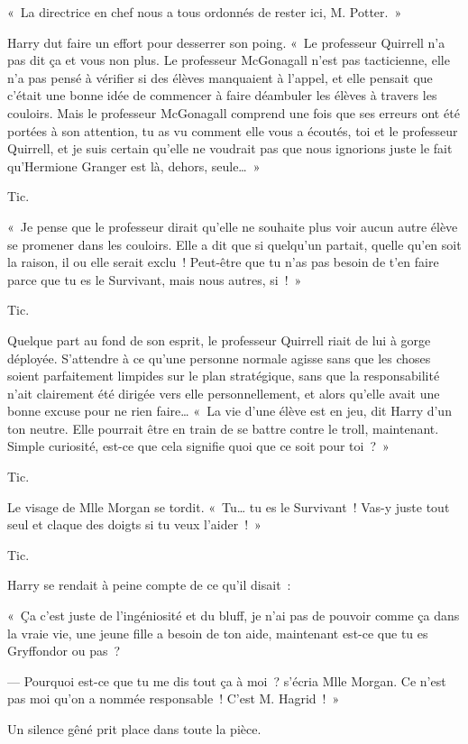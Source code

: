 «~La directrice en chef nous a tous ordonnés de rester ici, M. Potter.~»

Harry dut faire un effort pour desserrer son poing. «~Le professeur Quirrell n'a pas dit ça et vous non plus. Le professeur McGonagall n'est pas tacticienne, elle n'a pas pensé à vérifier si des élèves manquaient à l'appel, et elle pensait que c'était une bonne idée de commencer à faire déambuler les élèves à travers les couloirs. Mais le professeur McGonagall comprend une fois que ses erreurs ont été portées à son attention, tu as vu comment elle vous a écoutés, toi et le professeur Quirrell, et je suis certain qu'elle ne voudrait pas que nous ignorions juste le fait qu'Hermione Granger est là, dehors, seule…~»

Tic.

«~Je pense que le professeur dirait qu'elle ne souhaite plus voir aucun autre élève se promener dans les couloirs. Elle a dit que si quelqu'un partait, quelle qu'en soit la raison, il ou elle serait exclu~! Peut-être que tu n'as pas besoin de t'en faire parce que tu es le Survivant, mais nous autres, si~!~»

Tic.

Quelque part au fond de son esprit, le professeur Quirrell riait de lui à gorge déployée. S'attendre à ce qu'une personne normale agisse sans que les choses soient parfaitement limpides sur le plan stratégique, sans que la responsabilité n'ait clairement été dirigée vers elle personnellement, et alors qu'elle avait une bonne excuse pour ne rien faire… «~La vie d'une élève est en jeu, dit Harry d'un ton neutre. Elle pourrait être en train de se battre contre le troll, maintenant. Simple curiosité, est-ce que cela signifie quoi que ce soit pour toi~?~»

Tic.

Le visage de Mlle Morgan se tordit. «~Tu… tu es le Survivant~! Vas-y juste tout seul et claque des doigts si tu veux l'aider~!~»

Tic.

Harry se rendait à peine compte de ce qu'il disait~:

«~Ça c'est juste de l'ingéniosité et du bluff, je n'ai pas de pouvoir comme ça dans la vraie vie, une jeune fille a besoin de ton aide, maintenant est-ce que tu es Gryffondor ou pas~?

--- Pourquoi est-ce que tu me dis tout ça à moi~? s'écria Mlle Morgan. Ce n'est pas moi qu'on a nommée responsable~! C'est M. Hagrid~!~»

Un silence gêné prit place dans toute la pièce.

